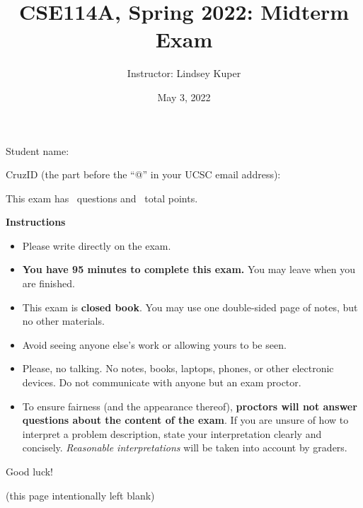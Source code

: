 \documentclass[addpoints]{exam}
\title{CSE114A, Spring 2022: Midterm Exam}
\author{Instructor: Lindsey Kuper}
\date{May 3, 2022}
\begin{document}
\maketitle

\begin{coverpages}

\bigskip  

\noindent Student name: \hrulefill

\bigskip
\bigskip

\noindent CruzID (the part before the ``@'' in your UCSC email address): \hrulefill

\bigskip
\bigskip

\noindent This exam has \numquestions~questions and \numpoints~total points.

\bigskip
\bigskip

\noindent \textbf{Instructions}

\begin{itemize}
\item Please write directly on the exam.
\item \textbf{You have 95 minutes to complete this exam.} You may leave when you are finished.
\item This exam is \textbf{closed book}.  You may use one double-sided page of notes, but no other materials.
\item Avoid seeing anyone else's work or allowing yours to be seen.
\item Please, no talking.  No notes, books, laptops, phones, or other electronic devices. Do not communicate with anyone but an exam proctor.
\item To ensure fairness (and the appearance thereof),
  \textbf{proctors will not answer questions about the content of the exam}. If you are unsure 
  of how to interpret a problem description, state your interpretation clearly and concisely. 
  \textit{Reasonable interpretations} will be taken into account by graders.
\end{itemize}
  
\bigskip

\noindent Good luck!

\newpage

(this page intentionally left blank)

\newpage  

\end{coverpages}
\end{document}
